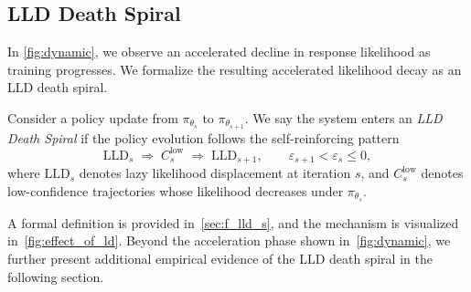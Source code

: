 \subsection{LLD Death Spiral}
In \cref{fig:dynamic}, we observe an accelerated decline in response likelihood as training progresses. We formalize the resulting accelerated likelihood decay as an LLD death spiral.
\begin{definition}
Consider a policy update from $\pi_{\theta_s}$ to $\pi_{\theta_{s+1}}$.
We say the system enters an \emph{LLD Death Spiral} if the policy evolution follows the self-reinforcing pattern
\[
\mathrm{LLD}_s
\;\Longrightarrow\;
C_s^{\mathrm{low}}
\;\Longrightarrow\;
\mathrm{LLD}_{s+1},
\qquad
\varepsilon_{s+1} < \varepsilon_s \le 0,
\]
where $\mathrm{LLD}_s$ denotes lazy likelihood displacement at iteration $s$, and $C_s^{\mathrm{low}}$ denotes low-confidence trajectories whose likelihood decreases under $\pi_{\theta_s}$.
\vspace{-2mm}
\end{definition}
A formal definition is provided in~\cref{sec:f_lld_s}, and the mechanism is visualized in~\cref{fig:effect_of_ld}. Beyond the acceleration phase shown in~\cref{fig:dynamic}, we further present additional empirical evidence of the LLD death spiral in the following section.
